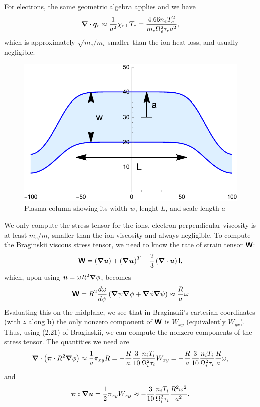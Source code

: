 \documentclass{revtex4-2}
\providecommand{\pitens}{\tensor{\pi}}
\begin{document}
For electrons, the same geometric algebra applies and we have
\begin{equation}
\dv{\bm{q}_e} \approx \frac{1}{a^2} \chi_{e\perp} T_e = \frac{4.66 n_e T_e^2}{m_e \cycfreq[e]^2 \tau_e a^2},
\end{equation}
which is approximately $\sqrt{m_e/m_i}$ smaller than the ion heat loss, and usually negligible.

\begin{figure}
\includegraphics{ScaleLengths.pdf}
\caption{Plasma column showing its width $w$, lenght $L$, and scale length $a$}
\label{scales}
\end{figure}

We only compute the stress tensor for the ions, electron perpendicular viscosity is at least $m_e/m_i$ smaller than the ion viscosity and always negligible.
To compute the Braginskii viscous stress tensor, we need to know the rate of strain tensor $\tensor{W}$:
\begin{equation}
\tensor{W} = \left(\grad\bm{u}\right) + \left(\grad\bm{u}\right)^{T} - \frac{2}{3} \left(\dv\bm{u}\right)\idmat,
\end{equation}
which, upon using $\bm{u} = \omega R^2 \grad\tor$, becomes
\begin{equation}
\tensor{W} = R^2 \frac{d \omega}{d\psi} \left( \grad\psi \grad \tor + \grad \tor \grad \psi\right) \approx \frac{R}{a} \omega
\end{equation}
Evaluating this on the midplane, we see that in Braginskii's cartesian coordinates (with $z$ along $\bm{b}$) the only nonzero component of $\tensor{W}$ is $W_{xy}$ (equivalently $W_{yx}$).
Thus, using (2.21) of Braginskii, we can compute the nonzero components of the stress tensor. The quantities we need are
\begin{equation}
\dv\left( \pitens\cdot R^2\grad\tor \right) \approx \frac{1}{a} \pi_{xy} R = - \frac{R}{a} \frac{3}{10} \frac{n_i T_i}{\cycfreq[i]^2 \tau_i} W_{xy} = - \frac{R}{a} \frac{3}{10} \frac{n_i T_i}{\cycfreq[i]^2 \tau_i} \frac{R}{a} \omega,
\end{equation}
and
\begin{equation}
\pitens \bm{:}\grad\bm{u} = \frac{1}{2} \pi_{xy} W_{xy} \approx - \frac{3}{10} \frac{n_i T_i}{\cycfreq[i]^2 \tau_i}\frac{R^2\omega^2}{a^2}.
\end{equation}
\end{document}
